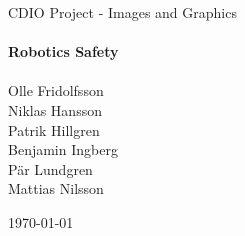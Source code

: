\begin{titlepage}

\begin{center}   

{\Large CDIO Project - Images and Graphics }\\[1cm]

\HRule \\[0.4cm]%
{\huge \bfseries Robotics Safety}\\[0.4cm]
\HRule \\[1.3cm]%


{\large Olle Fridolfsson\\
		Niklas Hansson\\
		Patrik Hillgren\\		
		Benjamin Ingberg \\
		Pär Lundgren\\
		Mattias Nilsson\\
		}

\vfill

{\large \today}

\end{center}
\end{titlepage}